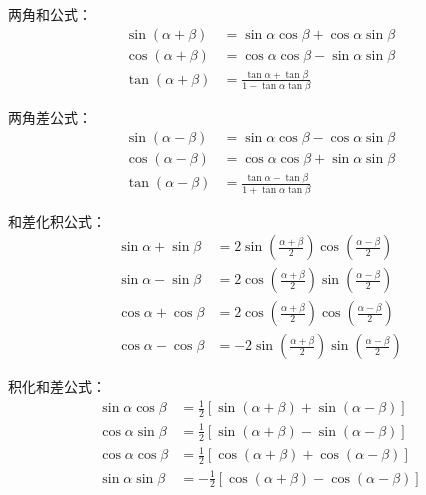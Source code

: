 \documentclass[12pt, a4paper, oneside, UTF8]{ctexbook}
\begin{document}
\begin{remark}
    \item 两角和公式：
    \begin{align*}
        \sin(\alpha + \beta) &= \sin\alpha\cos\beta + \cos\alpha\sin\beta \\
        \cos(\alpha + \beta) &= \cos\alpha\cos\beta - \sin\alpha\sin\beta \\
        \tan(\alpha + \beta) &= \frac{\tan\alpha + \tan\beta}{1 - \tan\alpha\tan\beta}
    \end{align*}
    
    \item 两角差公式：
    \begin{align*}
        \sin(\alpha - \beta) &= \sin\alpha\cos\beta - \cos\alpha\sin\beta \\
        \cos(\alpha - \beta) &= \cos\alpha\cos\beta + \sin\alpha\sin\beta \\
        \tan(\alpha - \beta) &= \frac{\tan\alpha - \tan\beta}{1 + \tan\alpha\tan\beta}
    \end{align*}
    
    \item 和差化积公式：
    \begin{align*}
        \sin\alpha + \sin\beta &= 2\sin\left(\frac{\alpha+\beta}{2}\right)\cos\left(\frac{\alpha-\beta}{2}\right) \\
        \sin\alpha - \sin\beta &= 2\cos\left(\frac{\alpha+\beta}{2}\right)\sin\left(\frac{\alpha-\beta}{2}\right) \\
        \cos\alpha + \cos\beta &= 2\cos\left(\frac{\alpha+\beta}{2}\right)\cos\left(\frac{\alpha-\beta}{2}\right) \\
        \cos\alpha - \cos\beta &= -2\sin\left(\frac{\alpha+\beta}{2}\right)\sin\left(\frac{\alpha-\beta}{2}\right)
    \end{align*}
    
    \item 积化和差公式：
    \begin{align*}
        \sin\alpha\cos\beta &= \frac{1}{2}[\sin(\alpha+\beta) + \sin(\alpha-\beta)] \\
        \cos\alpha\sin\beta &= \frac{1}{2}[\sin(\alpha+\beta) - \sin(\alpha-\beta)] \\
        \cos\alpha\cos\beta &= \frac{1}{2}[\cos(\alpha+\beta) + \cos(\alpha-\beta)] \\
        \sin\alpha\sin\beta &= -\frac{1}{2}[\cos(\alpha+\beta) - \cos(\alpha-\beta)]
    \end{align*}
\end{remark}
\end{document}

